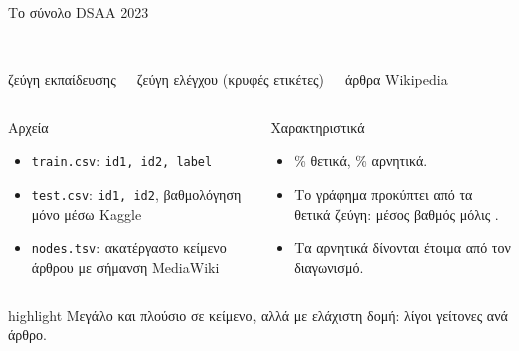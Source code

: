 \documentclass[11pt,aspectratio=169]{beamer}
\newcommand{\en}[1]{\foreignlanguage{english}{#1}}
\newcommand{\takeaway}[1]{%
  \begin{beamercolorbox}[wd=\linewidth,sep=0.65em,rounded=true]{highlight}
    \centering #1
  \end{beamercolorbox}}
\newcommand{\bignum}[2]{%
  {\centering{\Huge\bfseries\color{Teal} #1}\\[0.2cm]{\small #2}\par}}
\begin{document}
\begin{frame}{Το σύνολο \en{DSAA 2023}}
  \begin{columns}[T,onlytextwidth]
      \bignum{\TrainPairs{}}{ζεύγη εκπαίδευσης}
      \bignum{\TestPairs{}}{ζεύγη ελέγχου (κρυφές ετικέτες)}
      \bignum{\GraphNodesTotal{}}{άρθρα \en{Wikipedia}}
  \end{columns}
  \vspace{0.2cm}
  \begin{columns}[T,onlytextwidth]
      \begin{block}{Αρχεία}
        \small
        \begin{itemize}
          \item \en{\texttt{train.csv}}: \en{\texttt{id1, id2, label}}
          \item \en{\texttt{test.csv}}: \en{\texttt{id1, id2}}, βαθμολόγηση
            μόνο μέσω \en{Kaggle}
          \item \en{\texttt{nodes.tsv}}: ακατέργαστο κείμενο άρθρου με
            σήμανση \en{MediaWiki}
        \end{itemize}
      \end{block}
      \begin{block}{Χαρακτηριστικά}
        \small
        \begin{itemize}
          \item \TrainPosPct\% θετικά, \TrainNegPct\% αρνητικά.
          \item Το γράφημα προκύπτει από τα θετικά ζεύγη: μέσος βαθμός
            μόλις \GraphMeanDegree{}.
          \item Τα αρνητικά δίνονται έτοιμα από τον διαγωνισμό.
        \end{itemize}
      \end{block}
  \end{columns}
  \takeaway{Μεγάλο και πλούσιο σε κείμενο, αλλά με ελάχιστη δομή: λίγοι
    γείτονες ανά άρθρο.}
\end{frame}
\end{document}
